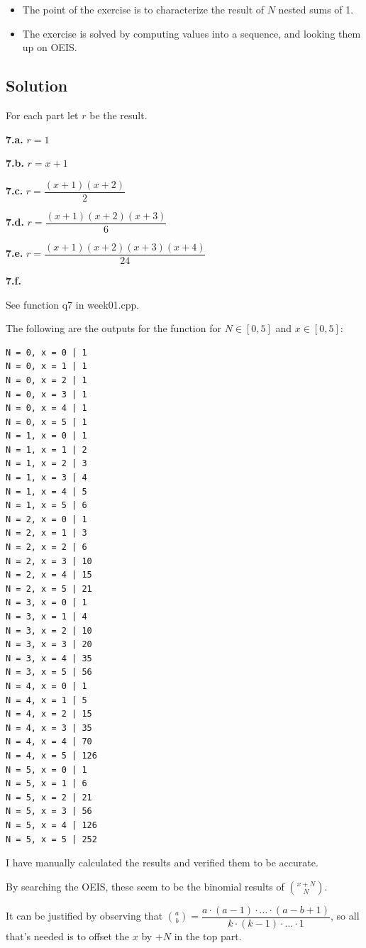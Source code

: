 \documentclass[12pt]{article}
\begin{document}
\begin{itemize}

\item
  The point of the exercise is to characterize the result of $N$ nested sums of 1.

\item
  The exercise is solved by computing values into a sequence, and looking them up on OEIS.

\end{itemize}


\subsection{Solution}

For each part let $r$ be the result.

\textbf{7.a.} $r = 1$

\textbf{7.b.} $r = x + 1$

\textbf{7.c.} $r = \dfrac{(x + 1)(x + 2)}{2}$

\textbf{7.d.} $r = \dfrac{(x + 1)(x + 2)(x + 3)}{6}$

\textbf{7.e.} $r = \dfrac{(x + 1)(x + 2)(x + 3)(x + 4)}{24}$

\textbf{7.f.}

See function q7 in week01.cpp.

The following are the outputs for the function for $N \in [0,5]$ and
$x \in [0,5]$:

\begin{verbatim}
N = 0, x = 0 | 1
N = 0, x = 1 | 1
N = 0, x = 2 | 1
N = 0, x = 3 | 1
N = 0, x = 4 | 1
N = 0, x = 5 | 1
N = 1, x = 0 | 1
N = 1, x = 1 | 2
N = 1, x = 2 | 3
N = 1, x = 3 | 4
N = 1, x = 4 | 5
N = 1, x = 5 | 6
N = 2, x = 0 | 1
N = 2, x = 1 | 3
N = 2, x = 2 | 6
N = 2, x = 3 | 10
N = 2, x = 4 | 15
N = 2, x = 5 | 21
N = 3, x = 0 | 1
N = 3, x = 1 | 4
N = 3, x = 2 | 10
N = 3, x = 3 | 20
N = 3, x = 4 | 35
N = 3, x = 5 | 56
N = 4, x = 0 | 1
N = 4, x = 1 | 5
N = 4, x = 2 | 15
N = 4, x = 3 | 35
N = 4, x = 4 | 70
N = 4, x = 5 | 126
N = 5, x = 0 | 1
N = 5, x = 1 | 6
N = 5, x = 2 | 21
N = 5, x = 3 | 56
N = 5, x = 4 | 126
N = 5, x = 5 | 252
\end{verbatim}

I have manually calculated the results and verified them to be accurate.

By searching the OEIS, these seem to be the binomial results of
$\displaystyle\binom{x + N}{N}$.

It can be justified by observing that
$\displaystyle\binom{a}{b} = \dfrac{a \cdot (a - 1) \cdot \dots \cdot (a - b + 1)}{k \cdot (k - 1) \cdot \dots \cdot 1}$,
so all that's needed is to offset the $x$ by $+N$ in the top part.
\end{document}
